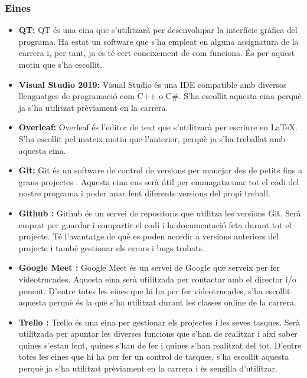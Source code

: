 \documentclass[a4paper]{article}
\begin{document}
\subsubsection{Eines}
\begin{itemize}
    \item \textbf{QT:} QT és una eina que s'utilitzarà per desenvolupar la interfície gràfica del programa. Ha estat un software que s'ha empleat en alguna assignatura de la carrera i, per tant, ja es té cert coneixement de com funciona. És per aquest motiu que s'ha escollit. 
    \item \textbf{Visual Studio 2019:} Visual Studio és una IDE compatible amb diversos llenguatges de programació com C++ o C\#. S'ha escollit aquesta eina perquè ja s'ha utilitzat prèviament en la carrera.  
    \item \textbf{Overleaf:} Overleaf és l'editor de text que s'utilitzarà per escriure en \LaTeX. S'ha escollit pel mateix motiu que l'anterior, perquè ja s'ha treballat amb aquesta eina.
    \item \textbf{Git:} Git és un software de control de versions per manejar des de petits fins a grans projectes \cite{git}. Aquesta eina ens serà útil per emmagatzemar tot el codi del nostre programa i poder anar fent diferents versions del propi treball.
    \item \textbf{Github \cite{Github}:} Github és un servei de repositoris que utilitza les versions Git. Serà emprat per guardar i compartir el codi i la documentació feta durant tot el projecte. Té l'avantatge de què es poden accedir a versions anteriors del projecte i també gestionar els errors i bugs trobats. 
    \item \textbf{Google Meet \cite{GoogleMeet}:} Google Meet és un servei de Google que serveix per fer videotrucades. Aquesta eina serà utilitzada per contactar amb el director i/o ponent. D'entre totes les eines que hi ha per fer videotrucades, s'ha escollit aquesta perquè és la que s'ha utilitzat durant les classes online de la carrera.
    \item \textbf{Trello \cite{Trello}:} Trello és una eina per gestionar els projectes i les seves tasques. Serà utilitzada per apuntar les diverses funcions que s'han de realitzar i així saber quines s'estan fent, quines s'han de fer i quines s'han realitzat del tot. D'entre totes les eines que hi ha per fer un control de tasques, s'ha escollit aquesta perquè ja s'ha utilitzat prèviament en la carrera i és senzilla d'utilitzar.
\end{itemize}
\end{document}
